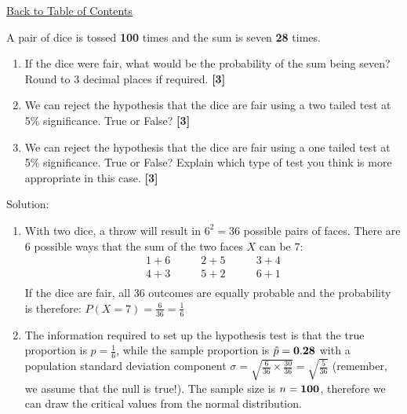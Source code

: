 \documentclass[a4paper, leqno, 12pt]{report}
\newenvironment{top_enumerate}{
\begin{enumerate}
  \setlength{\itemsep}{2em}
  \setlength{\topsep}{-0pt}
  \setlength{\partopsep}{-0pt}
}{\end{enumerate}}
\begin{document}
\hyperlink{contents}{Back to Table of Contents}
\begin{top_enumerate}
\item A pair of dice is tossed {\bf 100} times and the sum is seven {\bf 28} times.
 
\setcounter{equation}{0}  %
\begin{enumerate}
	\setlength{\topsep}{-0pt}
	\setlength{\partopsep}{-0pt}
	\setlength{\itemsep}{10pt}
			\item If the dice were fair, what would be the probability of the sum being seven? Round to 3 decimal places if required.
	 \quad \textbf{[3]}
		\item We can reject the hypothesis that the dice are fair using a two tailed test at 5\% significance. True or False?
	 \quad \textbf{[3]}
		\item We can reject the hypothesis that the dice are fair using a one tailed test at 5\% significance. True or False? Explain which type of test you think is more appropriate in this case.
	 \quad \textbf{[3]}
\end{enumerate}\addtocounter{enumi}{-1}
\item Solution:
 
\setcounter{equation}{0}  %
\begin{enumerate}
	\setlength{\topsep}{-0pt}
	\setlength{\partopsep}{-0pt}
	\setlength{\itemsep}{10pt}
			\item With two dice, a throw will result in $6^2=36$ possible pairs of faces. There are $6$ possible ways that the sum of the two faces $X$ can be $7$:
	\[
	\begin{aligned}
	1 + 6 \quad & \quad 2 + 5 \quad & \quad 3 + 4\\
	4 + 3 \quad & \quad 5 + 2 \quad & \quad 6 + 1\\
	\end{aligned}
	\]
	If the dice are fair, all 36 outcomes are equally probable and the probability is therefore:
	$P\left(X = 7 \right) = \frac{6}{36} = \frac{1}{6}$
	 \quad \textbf{}
		\item The information required to set up the hypothesis test is that the true proportion is $p = \frac{1}{6}$, while the sample proportion is $\hat p = {\bf 0.28}$ with a population standard deviation component $\sigma = \sqrt{\frac{6}{36} \times \frac{30}{36}} = \sqrt{\frac{5}{36}}$ (remember, we assume that the null is true!). The sample size is $n={\bf 100}$, therefore we can draw the critical values from the normal distribution.
	

\end{enumerate}
\end{top_enumerate}
\end{document}
